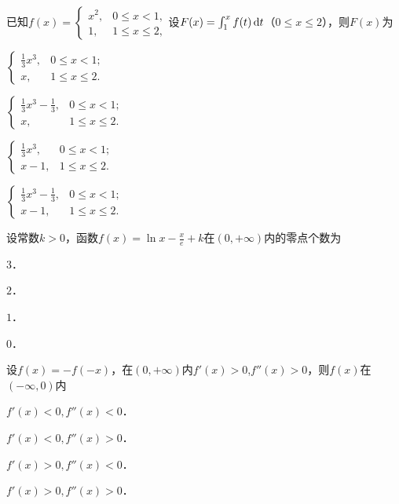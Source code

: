 \documentclass[plain,noanswer,medmath]{../../template/jnuexam}
\begin{document}
\begin{problem}
已知$f(x) = \begin{cases}
  x^2, & 0 \le x < 1, \\
    1, & 1 \le x \le 2,
\end{cases}$设$F(x) = \int_1^xf (t)\mathop{}\!\mathrm{d} t$（$0 \le x \le 2$），则$F(x)$为\pickout{}
\begin{abcd}
\item $\begin{cases}
  \frac{1}{3}x^3, & 0 \le x < 1; \\
               x, & 1 \le x \le 2.
\end{cases}$
\item $\begin{cases}
  \frac{1}{3}x^3 - \frac{1}{3}, & 0 \le x < 1; \\
                             x, & 1 \le x \le 2.
\end{cases}$
\item $\begin{cases}
  \frac{1}{3}x^3, & 0 \le x < 1; \\
           x - 1, & 1 \le x \le 2.
\end{cases}$
\item $\begin{cases}
  \frac{1}{3}x^3 - \frac{1}{3}, & 0 \le x < 1; \\
                         x - 1, & 1 \le x \le 2.
\end{cases}$
\end{abcd}
\end{problem}


\begin{problem}
设常数$k > 0$，函数$f(x) = \ln x - \frac{x}{e} + k$在$(0, +\infty)$内的零点个数为\pickout{}
\begin{abcd}
\item $3$．			
\item $2$．			
\item $1$．			
\item $0$．
\end{abcd}
\end{problem}


\begin{problem}
设$f(x) = - f(- x)$，在$(0, +\infty)$内$f'(x) > 0$,$f''(x) > 0$，则$f(x)$在$(-\infty ,0)$内\pickout{}
\begin{abcd}
\item $f'(x) < 0,f''(x) < 0$．		
\item $f'(x) < 0,f''(x) > 0$．
\item $f'(x) > 0,f''(x) < 0$．		
\item $f'(x) > 0,f''(x) > 0$．
\end{abcd}
\end{problem}
\end{document}
